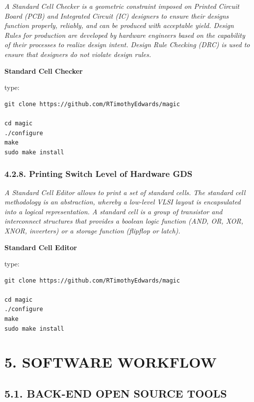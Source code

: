 \documentclass[
]{article}
\begin{document}
\emph{A Standard Cell Checker is a geometric constraint imposed on
Printed Circuit Board (PCB) and Integrated Circuit (IC) designers to
ensure their designs function properly, reliably, and can be produced
with acceptable yield. Design Rules for production are developed by
hardware engineers based on the capability of their processes to realize
design intent. Design Rule Checking (DRC) is used to ensure that
designers do not violate design rules.}

\textbf{Standard Cell Checker}

type:

\begin{verbatim}
git clone https://github.com/RTimothyEdwards/magic

cd magic
./configure
make
sudo make install
\end{verbatim}

\hypertarget{printing-switch-level-of-hardware-gds}{%
\subsubsection{4.2.8. Printing Switch Level of Hardware
GDS}\label{printing-switch-level-of-hardware-gds}}

\emph{A Standard Cell Editor allows to print a set of standard cells.
The standard cell methodology is an abstraction, whereby a low-level
VLSI layout is encapsulated into a logical representation. A standard
cell is a group of transistor and interconnect structures that provides
a boolean logic function (AND, OR, XOR, XNOR, inverters) or a storage
function (flipflop or latch).}

\textbf{Standard Cell Editor}

type:

\begin{verbatim}
git clone https://github.com/RTimothyEdwards/magic

cd magic
./configure
make
sudo make install
\end{verbatim}

\hypertarget{software-workflow}{%
\section{5. SOFTWARE WORKFLOW}\label{software-workflow}}

\hypertarget{back-end-open-source-tools-1}{%
\subsection{5.1. BACK-END OPEN SOURCE
TOOLS}\label{back-end-open-source-tools-1}}
\end{document}
